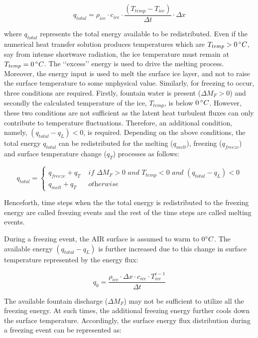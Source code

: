 $$q_{total} =\rho_{ice} \cdot c_{ice} \cdot \frac{(T_{temp}-T_{ice})}{\Delta t} \cdot \Delta x$$

where $q_{total}$ represents the total energy available to be redistributed. Even if the numerical heat transfer
solution produces temperatures which are $T_{temp}>0\, ^{\circ} C$, say from intense shortwave radiation, the ice
temperature must remain at $T_{temp} = 0\, ^{\circ} C$. The ‘‘excess’’ energy is used to drive the melting
process. Moreover, the energy input is used to melt the surface ice layer, and not to raise the surface
temperature to some unphysical value. Similarly, for freezing to occur, three conditions are required. Firstly,
fountain water is present ($\Delta M_{F} > 0 $) and secondly the calculated temperature of the ice, $T_{temp}$,
is below $0\, ^{\circ} C$. However, these two conditions are not sufficient as the latent heat turbulent fluxes
can only contribute to temperature fluctuations. Therefore, an additional condition, namely, $(q_{total}-q_{L})
	< 0$, is required. Depending on the above conditions, the total energy $q_{total}$ can be redistributed
for the melting ($q_{melt}$), freezing ($q_{freeze}$) and surface temperature change ($q_{T}$) processes as
follows:

\begin{equation}
	q_{total} = \left\{ \begin{array}{ll}
		q_{freeze} + q_{T} & \textit{ if } \Delta M_{F} > 0 \textit{ and } T_{temp} < 0 \textit{ and }(q_{total}-q_{L}) < 0 \\
		q_{melt} + q_{T}   & \textit{ otherwise}
	\end{array} \right.
\end{equation}

Henceforth, time steps when the the total energy is redistributed to the freezing energy are called freezing
events and the rest of the time steps are called melting events.


During a freezing event, the AIR surface is assumed to warm to $0 ^{\circ} C$. The available energy
$(q_{total}-q_{L})$ is further increased due to this change in surface temperature represented by the energy
flux:

$$q_{0} = \frac{\rho_{ice} \cdot \Delta x \cdot c_{ice} \cdot T_{ice}^{i-1}}{\Delta t}$$

The available fountain discharge ($\Delta M_{F}$) may not be sufficient to utilize all the freezing energy. At such times,
the additional freezing energy further cools down the surface temperature. Accordingly, the surface energy flux
distribution during a freezing event can be represented as:

